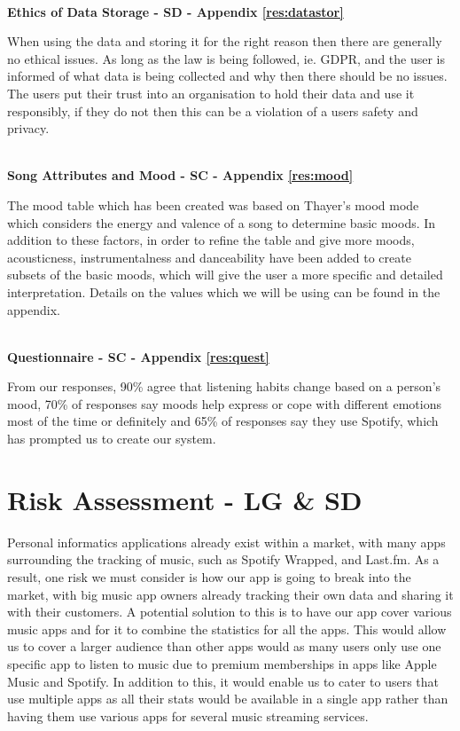 \documentclass[10pt, notitlepage]{report}
\begin{document}
\leavevmode \\
\textbf{Ethics of Data Storage - SD - Appendix \ref{res:datastor}}

When using the data and storing it for the right reason then there are generally no ethical issues. As long as the law is being followed, ie. GDPR, and the user is informed of what data is being collected and why then there should be no issues. The users put their trust into an organisation to hold their data and use it responsibly, if they do not then this can be a violation of a users safety and privacy.

\leavevmode \\
\textbf{Song Attributes and Mood - SC - Appendix \ref{res:mood}}

The mood table which has been created was based on Thayer’s mood mode which considers the energy and valence of a song to determine basic moods. In addition to these factors, in order to refine the table and give more moods, acousticness, instrumentalness and danceability have been added to create subsets of the basic moods, which will give the user a more specific and detailed interpretation. Details on the values which we will be using can be found in the appendix.

\leavevmode \\
\textbf{Questionnaire - SC - Appendix \ref{res:quest}}

From our responses, 90\% agree that listening habits change based on a person's mood, 70\% of responses say moods help express or cope with different emotions most of the time or definitely and 65\% of responses say they use Spotify, which has prompted us to create our system.


\chapter{Risk Assessment - LG \& SD}
Personal informatics applications already exist within a market, with many apps surrounding the tracking of music, such as Spotify Wrapped, and Last.fm. As a result, one risk we must consider is how our app is going to break into the market, with big music app owners already tracking their own data and sharing it with their customers. A potential solution to this is to have our app cover various music apps and for it to combine the statistics for all the apps. This would allow us to cover a larger audience than other apps would as many users only use one specific app to listen to music due to premium memberships in apps like Apple Music and Spotify. In addition to this, it would enable us to cater to users that use multiple apps as all their stats would be available in a single app rather than having them use various apps for several music streaming services.
\end{document}
